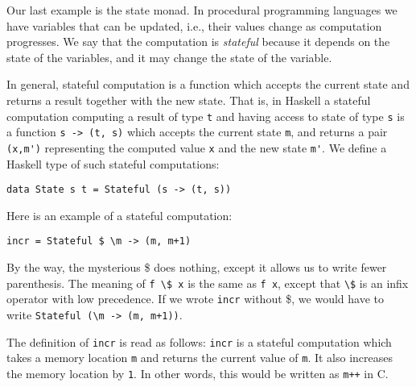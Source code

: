 \documentclass[a4paper,10pt]{article}
\newcommand{\cc}[1]{\lstinline{#1}}
\begin{document}
Our last example is the state monad. In procedural programming languages we
have variables that can be updated, i.e., their values change as computation
progresses. We say that the computation is \emph{stateful} because it depends
on the state of the variables, and it may change the state of the variable.

In general, stateful computation is a function which accepts the current state
and returns a result together with the new state. That is, in Haskell a
stateful computation computing a result of type \cc{t} and having access to
state of type \cc{s} is a function \cc{s -> (t, s)} which accepts the current
state \cc{m}, and returns a pair \cc{(x,m')} representing the computed value
\cc{x} and the new state \cc{m'}.
% 
We define a Haskell type of such stateful computations:
% 
\begin{lstlisting}
data State s t = Stateful (s -> (t, s))  
\end{lstlisting}
% 
Here is an example of a stateful computation:
% 
\begin{lstlisting}
incr = Stateful $ \m -> (m, m+1)  
\end{lstlisting}
By the way, the mysterious \$ does nothing, except it allows us to write fewer
parenthesis. The meaning of \cc{f \$ x} is the same as \cc{f x}, except that
\cc{\$} is an infix operator with low precedence. If we wrote \cc{incr}
without \$, we would have to write \cc{Stateful (\m -> (m, m+1))}.

The definition of \cc{incr} is read as follows: \cc{incr} is a stateful
computation which takes a memory location \cc{m} and returns the current value
of \cc{m}. It also increases the memory location by \cc{1}. In other words,
this would be written as \cc{m++} in C.
\end{document}
